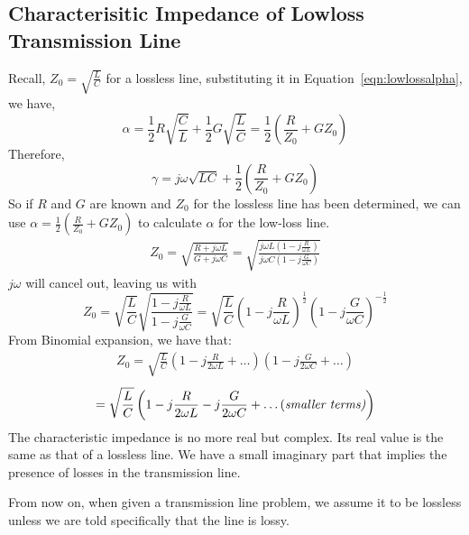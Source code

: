 \subsection{Characterisitic Impedance of Lowloss Transmission Line}
Recall, $Z_0 = \sqrt{\frac{L}{C}}$ for a lossless line, substituting it in Equation~\eqref{eqn:lowlossalpha}, we have,
\[\alpha = \frac{1}{2}R\sqrt{\frac{C}{L}} + \frac{1}{2}G\sqrt{\frac{L}{C}} = \frac{1}{2}\left(\frac{R}{Z_0} + GZ_0\right)\]
Therefore,
\[\gamma = j\omega\sqrt{LC} + \frac{1}{2}\left(\frac{R}{Z_0} + GZ_0\right)\]
So if $R$ and $G$ are known and $Z_0$ for the lossless line has been determined, we can use $\alpha = \frac{1}{2}(\frac{R}{Z_0} + GZ_0)$ to calculate $\alpha$ for the low-loss line.
\begin{align*}
Z_0 = \sqrt{\frac{R + j\omega L}{G + j\omega C}} = \sqrt{\frac{j\omega L(1 - j\frac{R}{\omega L})}{j\omega C(1 - j\frac{G}{\omega C})}}
\end{align*}
$j\omega$ will cancel out, leaving us with
\begin{dmath*}
Z_0 = \sqrt{\frac{L}{C}}\sqrt{\frac{1 - j\frac{R}{\omega L}}{1 - j\frac{G}{\omega C}}} =\sqrt{\frac{L}{C}}\left(1 - j\frac{R}{\omega L}\right)^{\frac{1}{2}}\left(1 - j\frac{G}{\omega C}\right)^{-\frac{1}{2}} 
\end{dmath*}
From Binomial expansion, we have that:
\begin{align*}
Z_0 = \sqrt{\frac{L}{C}}\left(1 - j\frac{R}{2\omega L} + \ldots\right)\left(1 - j\frac{G}{2\omega C} + \ldots\right)
\end{align*}
\begin{align*}
= \sqrt{\frac{L}{C}}\left(1 - j\frac{R}{2\omega L} - j\frac{G}{2\omega C} + \text{\ldots (\it{smaller terms})}\right)
\end{align*}
The characteristic impedance is no more real but complex. Its real value is the same as that of a lossless line. We have a small imaginary part that implies the presence of losses in the transmission line.

From now on, when given a transmission line problem, we assume it to be lossless unless we are told specifically that the line is lossy.




